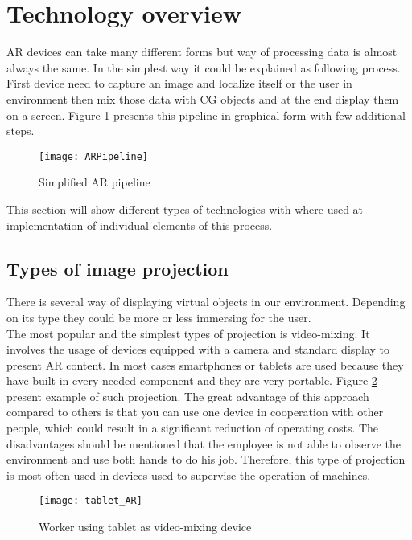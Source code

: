 \documentclass[printmode,en]{mgr}
\begin{document}
\section{Technology overview}
AR devices can take many different forms but way of processing data is almost always the same. In the simplest way it could be explained as following process. First device need to capture an image and localize itself or the user in environment then mix those data with CG objects and at the end display them on a screen. Figure \ref{fig:ARpipeline} presents this pipeline in graphical form with few additional steps.

\begin{figure}[!ht]
  \centering
    \texttt{[image: ARPipeline]}
  \caption{Simplified AR pipeline \cite{Shipyard}}
  \label{fig:ARpipeline}
\end{figure}

This section will show different types of technologies with where used at implementation of individual elements of this process.

\subsection{Types of image projection}
There is several way of displaying virtual objects in our environment. Depending on its type they could be more or less immersing for the user.\\

The most popular and the simplest types of projection is video-mixing. It involves the usage of devices equipped with a camera and standard display to present AR content. In most cases smartphones or tablets are used because they have built-in every needed component and they are very portable. Figure \ref{fig:tabletAR} present example of such projection. The great advantage of this approach compared to others is that you can use one device in cooperation with other people, which could result in a significant reduction of operating costs. The disadvantages should be mentioned that the employee is not able to observe the environment and use both hands to do his job. Therefore, this type of projection is most often used in devices used to supervise the operation of machines.

\begin{figure}[!ht]
  \centering
    \texttt{[image: tablet\_AR]}
  \caption{Worker using tablet as video-mixing device \cite{Shipyard}}
  \label{fig:tabletAR}
\end{figure}
\end{document}
